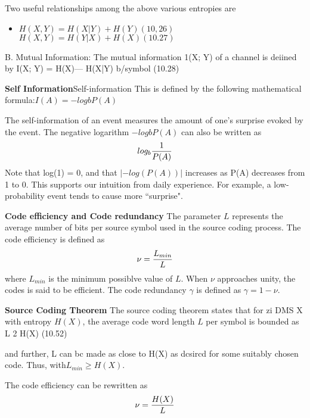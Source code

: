 \documentclass[a4]{beamer}
\begin{document}
\medskip
Two useful relationships among the above various entropies are
\begin{itemize} \item
$H(X, Y)=H(X|Y)+H(Y) (10,26)$
$H(X,Y)=H(Y|X)+H(X) (10.27)$
\end{itemize}
B. Mutual Information:
The mutual information 1(X; Y) of a channel is deiined by
I(X; Y) = H(X)— H(X|Y) b/symbol (10.28)


\medskip %
\noindent \textbf{Self Information}Self-information
This is defined by the following mathematical formula:$I(A) = −logb P(A)$

The self-information of an event measures the amount of one’s surprise
evoked by the event. The negative logarithm $−logb P(A)$ can also be written as \[
log_b  {1 \over P(A)} \]
Note that log(1) = 0, and that $| − log(P(A))|$ increases as P(A) decreases
from 1 to 0. This supports our intuition from daily experience. For example,
a low-probability event tends to cause more ``surprise".




\medskip
\noindent \textbf{Code efficiency and Code redundancy}
The parameter $L$ represents the average number of bits per source symbol used in the source coding process.
The code efficiency is defined as \[\nu = {L_{min} \over L} \]where $L_{min}$ is the minimum possiblve value of $L$. When $\nu$ approaches unity, the codes is said to be efficient. 
The code redundancy $\gamma$ is defined as $\gamma = 1- \nu$.



\medskip
\noindent \textbf{Source Coding Theorem}
The source coding theorem states that for zi DMS X with entropy $H(X)$, the average code word length $L$ per symbol is bounded as
L 2 H(X) (10.52)

and further, L can bc made as close to H(X) as dcsircd for some suitably chosen code.
Thus, with$ L_{min} \geq H(X)$.

The code efficiency can be rewritten as
\[\nu = {H(X) \over L} \]
\end{document}
